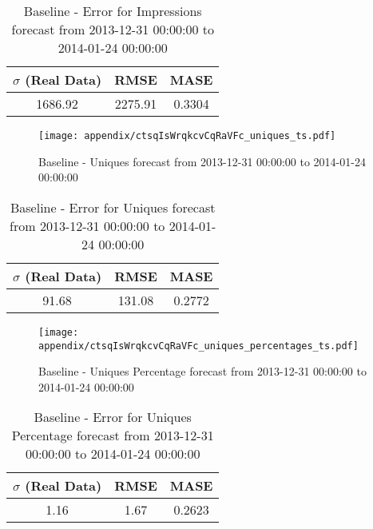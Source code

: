 \begin{table}[H]
\centering
\footnotesize
\begin{tabular}{ccc}
$\sigma$ (Real Data) & RMSE & MASE   \\ \hline
1686.92 & 2275.91 & 0.3304 \\
\end{tabular}

\vspace{0.5cm}

\caption{
Baseline - Error for Impressions forecast from 2013-12-31 00:00:00 to 2014-01-24 00:00:00}
\end{table}

\begin{figure}[H] \begin{center} \leavevmode
\texttt{[image: appendix/ctsqIsWrqkcvCqRaVFc\_uniques\_ts.pdf]} \caption{
Baseline - Uniques forecast from 2013-12-31 00:00:00 to 2014-01-24 00:00:00} \label{fig:appendix/ctsqIsWrqkcvCqRaVFc_uniques_ts.pdf} \end{center}
\end{figure}

\begin{table}[H]
\centering
\footnotesize
\begin{tabular}{ccc}
$\sigma$ (Real Data) & RMSE & MASE   \\ \hline
91.68 & 131.08 & 0.2772 \\
\end{tabular}

\vspace{0.5cm}

\caption{
Baseline - Error for Uniques forecast from 2013-12-31 00:00:00 to 2014-01-24 00:00:00}
\end{table}

\begin{figure}[H] \begin{center} \leavevmode
\texttt{[image: appendix/ctsqIsWrqkcvCqRaVFc\_uniques\_percentages\_ts.pdf]} \caption{
Baseline - Uniques Percentage forecast from 2013-12-31 00:00:00 to 2014-01-24 00:00:00} \label{fig:appendix/ctsqIsWrqkcvCqRaVFc_uniques_percentages_ts.pdf} \end{center}
\end{figure}

\begin{table}[H]
\centering
\footnotesize
\begin{tabular}{ccc}
$\sigma$ (Real Data) & RMSE & MASE   \\ \hline
1.16 & 1.67 & 0.2623 \\
\end{tabular}

\vspace{0.5cm}

\caption{
Baseline - Error for Uniques Percentage forecast from 2013-12-31 00:00:00 to 2014-01-24 00:00:00}
\end{table}

